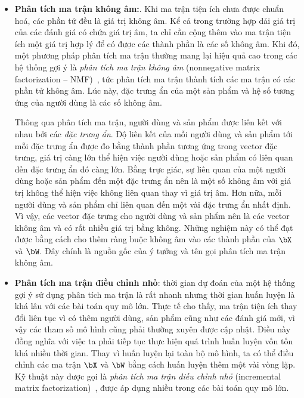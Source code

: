 \begin{itemize}
    \item \textbf{Phân tích ma trận không âm:}. Khi ma trận tiện ích chưa được
    chuẩn hoá, các phần tử đều là giá trị không âm. Kể cả trong trường hợp dải
    giá trị của các đánh giá có chứa giá trị âm, ta chỉ cần cộng thêm vào ma
    trận tiện ích một giá trị hợp lý để có được các thành phần là các số
    không âm. Khi đó, một phương pháp phân tích ma trận thường mang lại hiệu quả cao trong các hệ thống gợi ý là \textit{phân tích ma trận không âm} ({nonnegative matrix factorization} -- NMF)~\cite{zhang2006learning}, tức phân tích ma trận thành tích các ma
    trận có các phần tử không âm. Lúc này, đặc trưng ẩn của một sản phẩm và hệ số tương ứng của người dùng là các số không âm. 
 
    Thông qua phân tích ma trận, người dùng và sản phẩm được liên
    kết với nhau bởi các \textit{đặc trưng ẩn}. Độ liên kết của mỗi
    người dùng và sản phẩm tới mỗi đặc trưng ẩn được đo bằng thành phần tương
    ứng trong vector đặc trưng, giá trị càng lớn thể hiện việc
    người dùng hoặc sản phẩm có liên quan đến đặc trưng ẩn đó càng lớn.
    Bằng trực giác, sự liên quan của một người dùng hoặc sản phẩm đến
    một đặc trưng ẩn nên là một số không âm với giá trị không thể hiện việc không liên quan thay vì giá trị âm. Hơn nữa, mỗi người dùng và sản phẩm chỉ liên quan đến một vài đặc trưng ẩn nhất định. Vì vậy, các vector
    đặc trưng cho người dùng và sản phẩm nên là các vector không âm và
    có rất nhiều giá trị bằng không. Những nghiệm này có thể đạt được bằng cách cho
    thêm ràng buộc không âm vào các thành phần của $\bX$ và $\bW$. Đây
    chính là nguồn gốc của ý tưởng và tên gọi phân tích ma trận không âm.
 

    \item \textbf{Phân tích ma trận điều chỉnh nhỏ}: thời gian dự
    đoán của một hệ thống gợi ý sử dụng phân tích ma trận là rất nhanh nhưng
    thời gian huấn luyện là khá lâu với các bài toán quy mô lớn. Thực tế cho thấy,
    ma trận tiện ích thay đổi liên tục vì có thêm người dùng, sản phẩm cũng như
    các đánh giá mới, vì vậy các tham số mô hình cũng phải thường xuyên được cập
    nhật. Điều này đồng nghĩa với việc ta phải tiếp tục thực hiện quá trình huấn
    luyện vốn tốn khá nhiều thời gian. Thay vì huấn luyện lại toàn bộ mô hình,
    ta có thể điều chỉnh các ma trận $\bX$ và $\bW$ bằng cách huấn luyện thêm
    một vài vòng lặp. Kỹ thuật này được gọi là \textit{phân tích ma trận điều
    chỉnh nhỏ} ({incremental matrix factorization})~\cite{vinagre2014fast}, được
    áp dụng nhiều trong các bài toán quy mô lớn.
 

\end{itemize}
